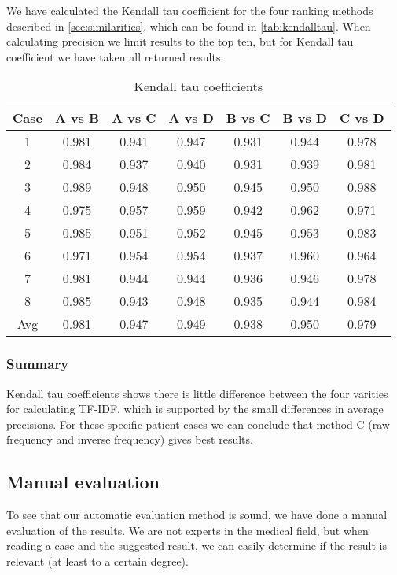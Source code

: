 \documentclass[a4paper, 11pt]{article}
\begin{document}
We have calculated the Kendall tau coefficient for the four ranking methods
described in \autoref{sec:similarities}, which can be found in
\autoref{tab:kendalltau}. When calculating precision we limit results to the
top ten, but for Kendall tau coefficient we have taken all returned results.
\begin{table}[tbp] \footnotesize \center
\caption{Kendall tau coefficients\label{tab:kendalltau}}
\begin{tabular}{c c c c c c c}
    \toprule
	Case & A vs B & A vs C & A vs D & B vs C & B vs D & C vs D \\
    \midrule
	1 & 0.981 & 0.941 & 0.947 & 0.931 & 0.944 & 0.978 \\
	2 & 0.984 & 0.937 & 0.940 & 0.931 & 0.939 & 0.981 \\
	3 & 0.989 & 0.948 & 0.950 & 0.945 & 0.950 & 0.988 \\
	4 & 0.975 & 0.957 & 0.959 & 0.942 & 0.962 & 0.971 \\
	5 & 0.985 & 0.951 & 0.952 & 0.945 & 0.953 & 0.983 \\
	6 & 0.971 & 0.954 & 0.954 & 0.937 & 0.960 & 0.964 \\
	7 & 0.981 & 0.944 & 0.944 & 0.936 & 0.946 & 0.978 \\
	8 & 0.985 & 0.943 & 0.948 & 0.935 & 0.944 & 0.984 \\
    \midrule
	Avg & 0.981 & 0.947 & 0.949 & 0.938 & 0.950 & 0.979 \\
	\bottomrule
\end{tabular}
\end{table}

\subsubsection{Summary}
Kendall tau coefficients shows there is little difference between the four
varities for calculating TF-IDF, which is supported by the small differences
in average precisions. For these specific patient cases we can conclude that
method C (raw frequency and inverse frequency) gives best results.

\subsection{Manual evaluation}
To see that our automatic evaluation method is sound, we have done a manual evaluation of the results. We are not experts in the medical field, but when reading a case and the suggested result, we can easily determine if the result is relevant (at least to a certain degree). 
\end{document}
